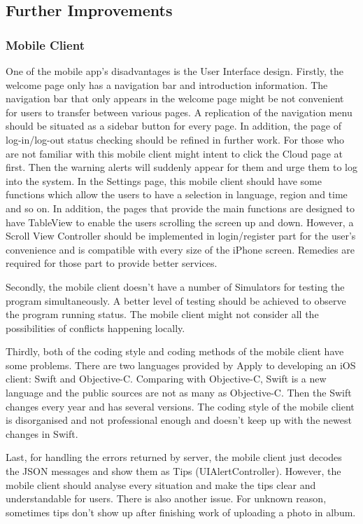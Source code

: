 \documentclass{article}
\begin{document}
\subsection{Further Improvements}
\subsubsection{Mobile Client}

One of the mobile app's disadvantages is the User Interface design. Firstly, the welcome page only has a navigation bar and introduction information. The navigation bar that only appears in the welcome page might be not convenient for users to transfer between various pages. A replication of the navigation menu should be situated as a sidebar button for every page. In addition, the page of log-in/log-out status checking should be refined in further work. For those who are not familiar with this mobile client might intent to click the Cloud page at first. Then the warning alerts will suddenly appear for them and urge them to log into the system. In the Settings page, this mobile client should have some functions which allow the users to have a selection in language, region and time and so on. In addition, the pages that provide the main functions are designed to have TableView to enable the users scrolling the screen up and down. However, a Scroll View Controller should be implemented in login/register part for the user's convenience and is compatible with every size of the iPhone screen. Remedies are required for those part to provide better services.

Secondly, the mobile client doesn't have a number of Simulators for testing the program simultaneously. A better level of testing should be achieved to observe the program running status. The mobile client might not consider all the possibilities of conflicts happening locally.

Thirdly, both of the coding style and coding methods of the mobile client have some problems. There are two languages provided by Apply to developing an iOS client: Swift and Objective-C. Comparing with Objective-C, Swift is a new language and the public sources are not as many as Objective-C. Then the Swift changes every year and has several versions. The coding style of the mobile client is disorganised and not professional enough and doesn't keep up with the newest changes in Swift. 

Last, for handling the errors returned by server, the mobile client just decodes the JSON messages and show them as Tips (UIAlertController). However, the mobile client should analyse every situation and make the tips clear and understandable for users. There is also another issue. For unknown reason, sometimes tips don't show up after finishing work of uploading a photo in album.
\end{document}

